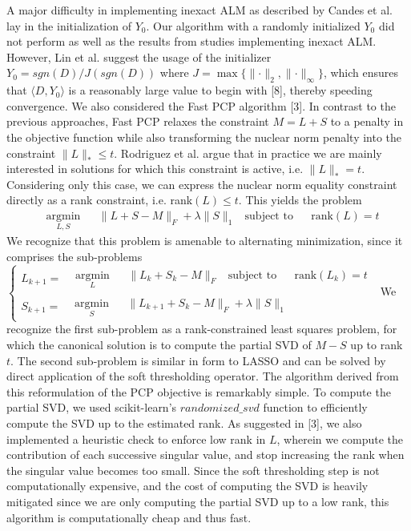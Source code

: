 \documentclass[oneside]{article}
\begin{document}
A major difficulty in implementing inexact ALM as described by Candes et al. lay in the initialization of $Y_{0}$. Our algorithm with a randomly initialized $Y_{0}$ did not perform as well as the results from studies implementing inexact ALM. However, Lin et al. suggest the usage of the initializer $Y_{0} = sgn(D)/J(sgn(D))$ where $J = \max\{\lVert\cdot\rVert_{2},\lVert\cdot\rVert_{\infty}\}$, which ensures that $\langle D,Y_{0}\rangle$ is a reasonably large value to begin with [8], thereby speeding convergence.\newline\newline
We also considered the Fast PCP algorithm [3]. In contrast to the previous approaches, Fast PCP relaxes the constraint $M=L+S$ to a penalty in the objective function while also transforming the nuclear norm penalty into the constraint $\lVert L\rVert_{*}\le t$. Rodriguez et al. argue that in practice we are mainly interested in solutions for which this constraint is active, i.e. $\lVert L\rVert_{*} = t$. Considering only this case, we can express the nuclear norm equality constraint directly as a rank constraint, i.e. rank$(L) \le t$. This yields the problem $$
\begin{aligned}
& \underset{L,S}{\text{argmin}}
& & \lVert L+S-M\rVert_{F}+ \lambda\lVert S\rVert_{1} 
& \text{subject to}
& & \text{rank}(L) = t
\end{aligned}
$$
We recognize that this problem is amenable to alternating minimization, since it comprises the sub-problems\newline
$\begin{cases}
L_{k+1}  =\begin{aligned}
& \underset{L}{\text{argmin}}
& & \lVert L_{k}+S_{k}-M\rVert_{F}
& \text{subject to}
& & \text{rank}(L_{k}) = t
\end{aligned}\\
S_{k+1} = \begin{aligned}
& \underset{S}{\text{argmin}}
& & \lVert L_{k+1}+S_{k}-M\rVert_{F}+ \lambda\lVert S\rVert_{1} 
\end{aligned}
\end{cases}
$\newline
We recognize the first sub-problem as a rank-constrained least squares problem, for which the canonical solution is to compute the partial SVD of $M-S$ up to rank $t$. The second sub-problem is similar in form to LASSO and can be solved by direct application of the soft thresholding operator.\newline\newline
The algorithm derived from this reformulation of the PCP objective is remarkably simple. To compute the partial SVD, we used scikit-learn's $randomized\_svd$ function to efficiently compute the SVD up to the estimated rank. As suggested in [3], we also implemented a heuristic check to enforce low rank in $L$, wherein we compute the contribution of each successive singular value, and stop increasing the rank when the singular value becomes too small. Since the soft thresholding step is not computationally expensive, and the cost of computing the SVD is heavily mitigated since we are only computing the partial SVD up to a low rank, this algorithm is computationally cheap and thus fast.
\end{document}

